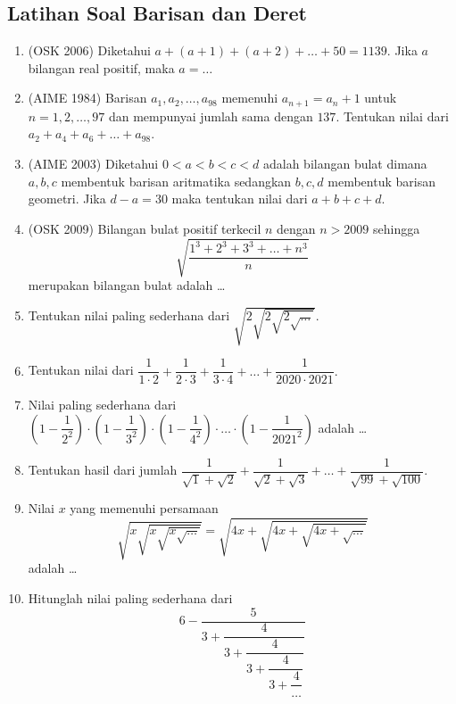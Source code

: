 \subsection{Latihan Soal Barisan dan Deret}
\begin{enumerate}
\item (OSK 2006) Diketahui $a+(a+1)+(a+2)+\dots+50=1139$. Jika $a$ bilangan real positif, maka $a=\dots$

\item (AIME 1984) Barisan $a_1,a_2,\dots,a_{98}$ memenuhi $a_{n+1}=a_n+1$ untuk $n=1,2,\dots,97$ dan mempunyai jumlah sama dengan $137$. Tentukan nilai dari $a_2+a_4+a_6+\dots+a_{98}$.

\item (AIME 2003) Diketahui $0<a<b<c<d$ adalah bilangan bulat dimana $a,b,c$ membentuk barisan aritmatika sedangkan $b,c,d$ membentuk barisan geometri. Jika $d-a=30$ maka tentukan nilai dari $a+b+c+d$.

\item (OSK 2009) Bilangan bulat positif terkecil $n$ dengan $n> 2009$ sehingga $$\sqrt{\dfrac{1^3+2^3+3^3+\dots+n^3}{n}}$$
merupakan bilangan bulat adalah \dots

\item Tentukan nilai paling sederhana dari $\sqrt{2\sqrt{2\sqrt{2\sqrt{\dots}}}}$.

\item Tentukan nilai dari $\dfrac{1}{1\cdot2}+\dfrac{1}{2\cdot 3}+\dfrac{1}{3 \cdot 4}+\dots+\dfrac{1}{2020 \cdot 2021}.$

\item  Nilai paling sederhana dari $\left(1-\dfrac{1}{2^2}\right)\cdot\left(1-\dfrac{1}{3^2}\right)\cdot\left(1-\dfrac{1}{4^2}\right)\cdot\dots\cdot\left(1-\dfrac{1}{2021^2}\right)$ adalah \dots

\item Tentukan hasil dari jumlah $\dfrac{1}{\sqrt{1}+\sqrt{2}}+\dfrac{1}{\sqrt{2}+\sqrt{3}}+\dots+\dfrac{1}{\sqrt{99}+\sqrt{100}}.$

\item Nilai $x$ yang memenuhi persamaan
$$\sqrt{x\sqrt{x\sqrt{x\sqrt{\dots}}}}=\sqrt{4x+\sqrt{4x+\sqrt{4x+\sqrt{\dots}}}}$$
adalah \dots

\item Hitunglah nilai paling sederhana dari
$$6-\dfrac{5}{3+\dfrac{4}{3+\dfrac{4}{3+\dfrac{4}{3+\dfrac{4}{\dots}}}}}$$
\end{enumerate}